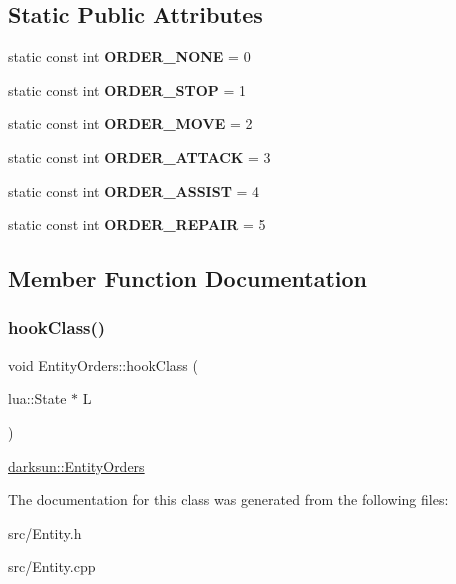 \subsection*{Static Public Attributes}
\begin{DoxyCompactItemize}
\item 
\mbox{\label{classdarksun_1_1_entity_orders_a514bd825076206c2e5e863611aaad2f1}} 
static const int {\bfseries O\+R\+D\+E\+R\+\_\+\+N\+O\+NE} = 0
\item 
\mbox{\label{classdarksun_1_1_entity_orders_a4f122491bc3c5572c0b8292b2dbc4c6f}} 
static const int {\bfseries O\+R\+D\+E\+R\+\_\+\+S\+T\+OP} = 1
\item 
\mbox{\label{classdarksun_1_1_entity_orders_ab2b8e827bbdc2de8f3efcc74d10e90da}} 
static const int {\bfseries O\+R\+D\+E\+R\+\_\+\+M\+O\+VE} = 2
\item 
\mbox{\label{classdarksun_1_1_entity_orders_a4314624d3b6d9e9edda8a8b53c462f23}} 
static const int {\bfseries O\+R\+D\+E\+R\+\_\+\+A\+T\+T\+A\+CK} = 3
\item 
\mbox{\label{classdarksun_1_1_entity_orders_ac85e65e56da223afe0c660693561f2dd}} 
static const int {\bfseries O\+R\+D\+E\+R\+\_\+\+A\+S\+S\+I\+ST} = 4
\item 
\mbox{\label{classdarksun_1_1_entity_orders_a79d4bcc6d887a3f94a5305165de3cdfb}} 
static const int {\bfseries O\+R\+D\+E\+R\+\_\+\+R\+E\+P\+A\+IR} = 5
\end{DoxyCompactItemize}


\subsection{Member Function Documentation}
\mbox{\label{classdarksun_1_1_entity_orders_aa7f4168fd2376ad3e4250215019e0407}} 
\subsubsection{\texorpdfstring{hookClass()}{hookClass()}}
{\footnotesize\ttfamily void Entity\+Orders\+::hook\+Class (\begin{DoxyParamCaption}\item[{lua\+::\+State $\ast$}]{L }\end{DoxyParamCaption})\hspace{0.3cm}{\ttfamily [static]}}

\mbox{\hyperlink{classdarksun_1_1_entity_orders}{darksun\+::\+Entity\+Orders}} 

The documentation for this class was generated from the following files\+:\begin{DoxyCompactItemize}
\item 
src/Entity.\+h\item 
src/Entity.\+cpp\end{DoxyCompactItemize}
